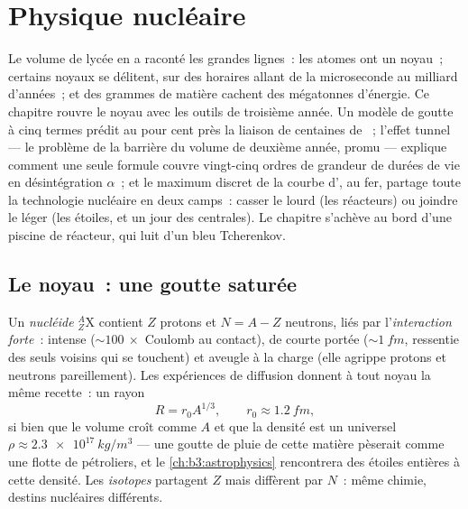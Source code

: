 \chapter{Physique nucléaire}\label{ch:b3:nuclear-physics}


Le volume de lycée en a raconté les grandes lignes~: les atomes ont
un noyau~; certains noyaux se délitent, sur des horaires allant de la
microseconde au milliard d'années~; et des grammes de matière cachent
des mégatonnes d'énergie. Ce chapitre rouvre le noyau avec les outils
de troisième année. Un modèle de goutte à cinq termes prédit au pour
cent près la liaison de centaines de ~; l'effet tunnel ---
le problème de la barrière du volume de deuxième année, promu ---
explique comment une seule formule couvre vingt-cinq ordres de
grandeur de durées de vie en désintégration $\alpha$~; et le maximum
discret de la courbe d', au fer, partage toute la
technologie nucléaire en deux camps~: casser le lourd (les
réacteurs) ou joindre le léger (les étoiles, et un jour des
centrales). Le chapitre s'achève au bord d'une piscine de réacteur,
qui luit d'un bleu Tcherenkov.

\section{Le noyau~: une goutte saturée}

\begin{definition}\label{def:b3:nuclear-physics:nuclide}
Un \emph{nucléide} $^{A}_{Z}\text{X}$ contient $Z$ protons et $N = A -
Z$ neutrons, liés par l'\emph{interaction forte}~: intense
(${\sim}\qty{100}{}\times$ Coulomb au contact), de courte portée
(${\sim}\qty{1}{fm}$, ressentie des seuls voisins qui se touchent)
et aveugle à la charge (elle agrippe protons et neutrons pareillement).
Les expériences de diffusion donnent à tout noyau la même recette~:
un rayon
\[
R = r_0A^{1/3} , \qquad r_0 \approx \qty{1.2}{fm} ,
\]
si bien que le volume croît comme $A$ et que la densité est un
universel $\rho \approx \qty{2.3e17}{kg/m^3}$ --- une goutte de pluie
de cette matière pèserait comme une flotte de pétroliers, et le
\cref{ch:b3:astrophysics} rencontrera des étoiles entières à cette
densité. Les \emph{isotopes} partagent $Z$ mais diffèrent par $N$~:
même chimie, destins nucléaires différents.
\end{definition}


